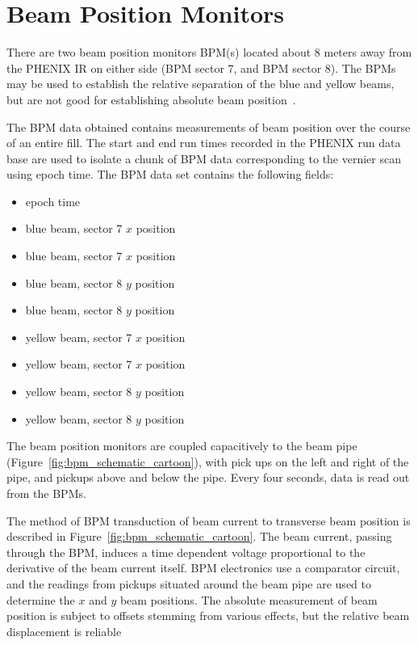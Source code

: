 \section{Beam Position Monitors}
\label{sec:beam_position_monitoring}
There are two beam position monitors BPM(s) located about 8 meters away from the
PHENIX IR on either side (BPM sector 7, and BPM sector 8). The BPMs may be used
to establish the relative separation of the blue and yellow beams, but are not
good for establishing absolute beam position~\cite{Drees2013}.  

The BPM data obtained contains measurements of beam position over the course of
an entire fill. The start and end run times recorded in the PHENIX run data
base are used to isolate a chunk of BPM data corresponding to the vernier scan
using epoch time. The BPM data set contains the following fields:
\begin{itemize}
\item epoch time
\item blue beam, sector 7 $x$ position
\item blue beam, sector 7 $x$ position
\item blue beam, sector 8 $y$ position
\item blue beam, sector 8 $y$ position
\item yellow beam, sector 7 $x$ position
\item yellow beam, sector 7 $x$ position
\item yellow beam, sector 8 $y$ position
\item yellow beam, sector 8 $y$ position
\end{itemize}

The beam position monitors are coupled capacitively to the beam
pipe (Figure~\ref{fig:bpm_schematic_cartoon}), with pick ups on the left and
right of the pipe, and pickups above and below the pipe. Every four seconds,
data is read out from the BPMs. 

The method of BPM transduction of beam current to transverse beam position is
described in Figure~\ref{fig:bpm_schematic_cartoon}. The beam current, passing
through the BPM,  induces a time dependent voltage proportional to the
derivative of the beam current itself. BPM electronics use a comparator circuit,
and the readings from pickups situated around the beam pipe are used to
determine the $x$ and $y$ beam positions. The absolute measurement of beam
position is subject to offsets stemming from various effects, but the relative
beam displacement is reliable~\cite{KawallFocus2004}

